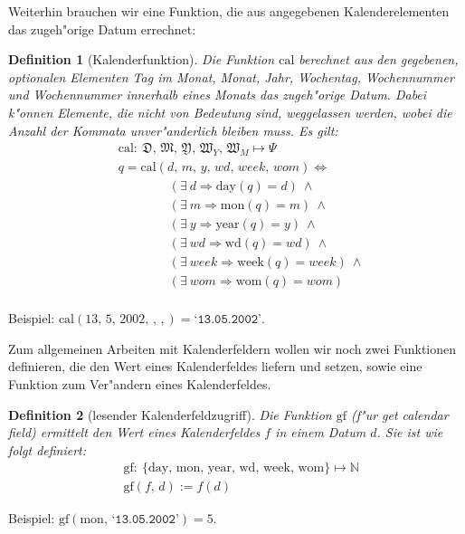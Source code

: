 \documentclass[a4paper]{article}
\newcommand*{\dayf}{\mathrm{day}}
\newcommand*{\monf}{\mathrm{mon}}
\newcommand*{\yearf}{\mathrm{year}}
\newcommand*{\wdf}{\mathrm{wd}}
\newcommand*{\weekf}{\mathrm{week}}
\newcommand*{\womf}{\mathrm{wom}}
\newcommand*{\calf}{\mathrm{cal}}
\newcommand*{\datev}[1]{\texttt{`#1'}}
\newcommand*{\gff}{\mathrm{gf}}
\newcommand*{\mondays}{\mathfrak{D}}
\newcommand*{\months}{\mathfrak{M}}
\newcommand*{\years}{\mathfrak{Y}}
\newcommand*{\weeksyr}{\mathfrak{W}_Y}
\newcommand*{\weeksmo}{\mathfrak{W}_M}
\numberwithin{equation}{section}
\newtheorem{dfn}{Definition}
\begin{document}
\noindent Weiterhin brauchen wir eine Funktion, die aus angegebenen
Kalenderelementen das zugeh"orige Datum errechnet:
\begin{dfn}[Kalenderfunktion]
  Die Funktion $\calf$ berechnet aus den gegebenen, optionalen Elementen Tag im
  Monat, Monat, Jahr, Wochentag, Wochennummer und Wochennummer innerhalb eines
  Monats das zugeh"orige Datum. Dabei k"onnen Elemente, die nicht von Bedeutung
  sind, weggelassen werden, wobei die Anzahl der Kommata unver"anderlich bleiben
  muss. Es gilt:
  \begin{equation}
  \begin{split}
    & \calf :\ \mondays,\,\months,\,\years,\,\weeksyr,\,\weeksmo \mapsto \Psi \\
    & q = \calf(d,\,m,\,y,\,wd,\,week,\,wom) \Leftrightarrow \\
    &   \qquad\qquad(\exists\ d \Rightarrow \dayf(q) = d)\ \wedge \\
    &   \qquad\qquad(\exists\ m \Rightarrow \monf(q) = m)\ \wedge \\
    &   \qquad\qquad(\exists\ y \Rightarrow \yearf(q) = y)\ \wedge \\
    &   \qquad\qquad(\exists\ wd \Rightarrow \wdf(q) = wd)\ \wedge \\
    &   \qquad\qquad(\exists\ week \Rightarrow \weekf(q) = week)\ \wedge \\
    &   \qquad\qquad(\exists\ wom \Rightarrow \womf(q) = wom) \\
  \end{split}
  \end{equation}
\end{dfn}
\noindent Beispiel: $\calf(13,\,5,\,2002,\,,\,,) = \datev{13.05.2002}$.

Zum allgemeinen Arbeiten mit Kalenderfeldern wollen wir noch zwei Funktionen
definieren, die den Wert eines Kalenderfeldes liefern und setzen, sowie eine
Funktion zum Ver"andern eines Kalenderfeldes.
\begin{dfn}[lesender Kalenderfeldzugriff]
  Die Funktion $\gff$ (f"ur \emph{get calendar field}) ermittelt den Wert eines
  Kalenderfeldes $f$ in einem Datum $d$. Sie ist wie folgt definiert:
  \begin{equation}
  \begin{split}
    & \gff :\ \{\dayf,\,\monf,\,\yearf,\,\wdf,\,\weekf,\,\womf\}
      \mapsto \mathbb{N} \\
    & \gff(f,\,d) := f(d)
  \end{split}
  \end{equation}
\end{dfn}
\noindent Beispiel: $\gff(\monf,\,\datev{13.05.2002}) = 5$.
\end{document}
